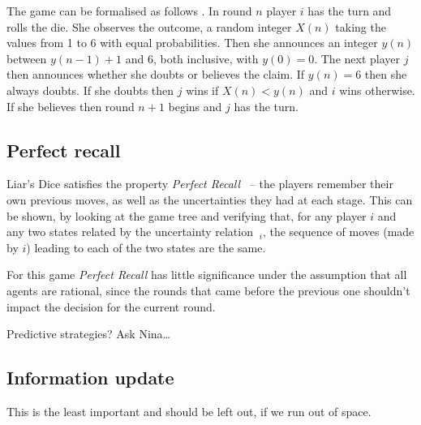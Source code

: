 The game can be formalised as follows \cite{ferguson1991}. In round $n$ player $i$ has the turn and rolls the die. She observes the outcome, a random integer $X(n)$ taking the values from 1 to 6 with equal probabilities. Then she announces an integer $y(n)$ between $y(n-1)+1$ and 6, both inclusive, with $y(0) = 0$. The next player $j$ then announces whether she doubts or believes the claim. If $y(n)=6$ then she always doubts. If she doubts then $j$ wins if $X(n) < y(n)$ and $i$ wins otherwise. If she believes then round $n+1$ begins and $j$ has the turn.

\subsection{Perfect recall}
Liar's Dice satisfies the property \emph{Perfect Recall}~\cite{benthem2001a} -- the players remember their own previous moves, as well as the uncertainties they had at each stage. This can be shown, by looking at the game tree and verifying that, for any player $i$ and any two states related by the uncertainty relation $~_i$, the sequence of moves (made by $i$) leading to each of the two states are the same. 

For this game \emph{Perfect Recall} has little significance under the assumption that all agents are rational, since the rounds that came before the previous one shouldn't impact the decision for the current round.

{ \color{red} Predictive strategies? Ask Nina\dots }

\subsection{Information update}

{ \color{red} This is the least important and should be left out, if we run out of space. }